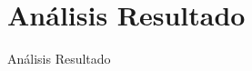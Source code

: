 \hypertarget{analisis_resultado}{%
    \section{Análisis Resultado}\label{Análisis Resultado}}

    Análisis Resultado